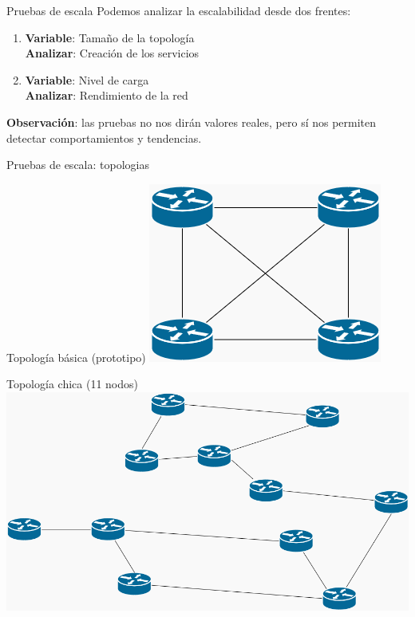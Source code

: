 \documentclass[xcolor=svgnames]{beamer}
\begin{document}
\begin{frame}{Pruebas de escala}
	Podemos analizar la escalabilidad desde dos frentes:
	\begin{enumerate}
		\item \textbf{Variable}: Tamaño de la topología \\
		\textbf{Analizar}: Creación de los servicios
		\item \textbf{Variable}: Nivel de carga \\
		\textbf{Analizar}: Rendimiento de la red \\
	\end{enumerate}
	\pause
	\vspace{4mm}
	\textbf{Observación}: las pruebas no nos dirán valores reales, pero sí nos permiten detectar comportamientos y tendencias.
\end{frame}

\begin{frame}{Pruebas de escala: topologias}
	\begin{minipage}[b]{0.3\textwidth}
		\begin{center}
			Topología básica (prototipo)
			\includegraphics[scale=0.4]{basic_topology}
		\end{center}
	\end{minipage}
	\hfill
	\begin{minipage}[b]{0.6\textwidth}
		\begin{center}
			Topología chica (11 nodos)
			\includegraphics[scale=0.25]{small_topology}
		\end{center}
	\end{minipage}
\end{frame}
\end{document}
